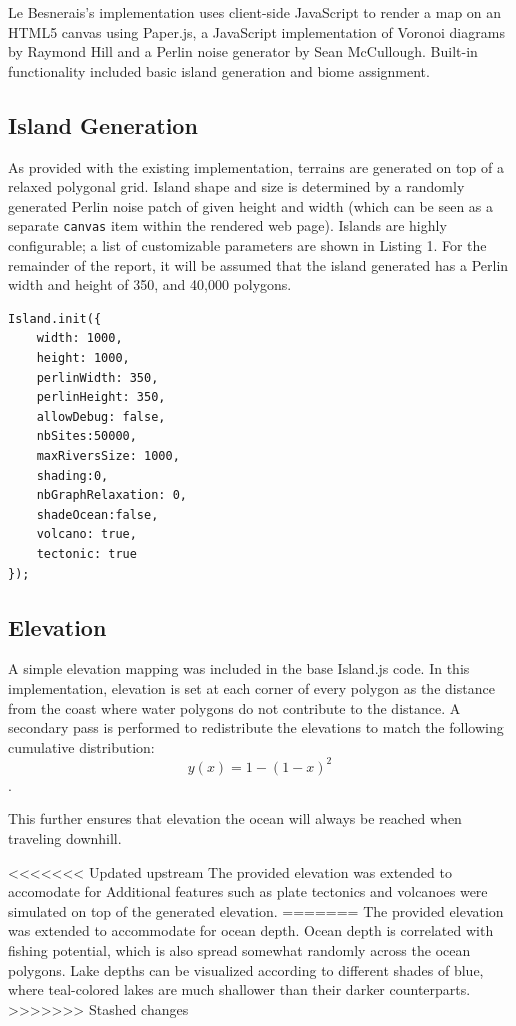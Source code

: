 Le Besnerais's implementation uses client-side JavaScript to render a map on an HTML5 canvas using Paper.js\cite{Lehni:2015:Online}, a JavaScript implementation of Voronoi diagrams by Raymond Hill \cite{Hill:2015:Online} and a Perlin noise generator by Sean McCullough\cite{McCullough:2015:Online}. Built-in functionality included basic island generation and biome assignment.

\subsection{Island Generation}
As provided with the existing implementation, terrains are generated on top of a relaxed polygonal grid. Island shape and size is determined by a randomly generated Perlin noise patch of given height and width (which can be seen as a separate \texttt{canvas} item within the rendered web page). Islands are highly configurable; a list of customizable parameters are shown in Listing 1. For the remainder of the report, it will be assumed that the island generated has a Perlin width and height of 350, and 40,000 polygons.

\begin{lstlisting}[caption=Island Parameters]
Island.init({
	width: 1000,
	height: 1000,
    perlinWidth: 350,
    perlinHeight: 350,
    allowDebug: false,
    nbSites:50000,
    maxRiversSize: 1000,
    shading:0,
    nbGraphRelaxation: 0,
    shadeOcean:false,
    volcano: true,
    tectonic: true
});
\end{lstlisting}

\subsection{Elevation}
A simple elevation mapping was included in the base Island.js code. In this implementation, elevation is set at each corner of every polygon as the distance from the coast where water polygons do not contribute to the distance. A secondary pass is performed to redistribute the elevations to match the following cumulative distribution: $$y(x) = 1 - (1-x)^2$$.

This further ensures that elevation the ocean will always be reached when traveling downhill.

<<<<<<< Updated upstream
The provided elevation was extended to accomodate for
Additional features such as plate tectonics and volcanoes were simulated on top of the generated elevation.
=======
The provided elevation was extended to accommodate for ocean depth. Ocean depth is correlated with fishing potential, which is also spread somewhat randomly across the ocean polygons. Lake depths can be visualized according to different shades of blue, where teal-colored lakes are much shallower than their darker counterparts. 
>>>>>>> Stashed changes

